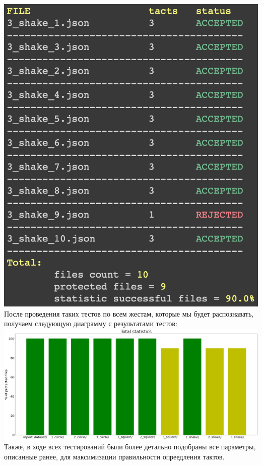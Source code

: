 \documentclass[a4paper]{article}
\begin{document}
\includegraphics[scale = 0.5]{example_of_test_part.png} \\

После проведения таких тестов по всем жестам, которые мы будет распознавать, получаем следующую диаграмму с результатами тестов: \\

\includegraphics[scale = 0.17]{total_statistics.png} \\

Также, в ходе всех тестирований были более детально подобраны все параметры, описанные ранее, для максимизации правильности опреедления тактов.
\end{document}
